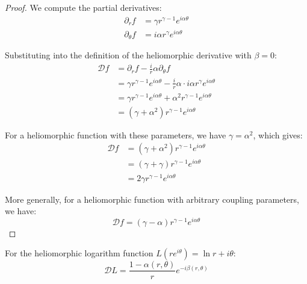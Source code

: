 \begin{proof}
We compute the partial derivatives:
\begin{align}
\partial_rf &= \gamma r^{\gamma-1}e^{i\alpha\theta}\\
\partial_\theta f &= i\alpha r^{\gamma}e^{i\alpha\theta}
\end{align}

Substituting into the definition of the heliomorphic derivative with $\beta = 0$:
\begin{align}
\mathcal{D}f &= \partial_rf - \frac{i}{r}\alpha\partial_\theta f\\
&= \gamma r^{\gamma-1}e^{i\alpha\theta} - \frac{i}{r}\alpha \cdot i\alpha r^{\gamma}e^{i\alpha\theta}\\
&= \gamma r^{\gamma-1}e^{i\alpha\theta} + \alpha^2 r^{\gamma-1}e^{i\alpha\theta}\\
&= \left(\gamma + \alpha^2\right)r^{\gamma-1}e^{i\alpha\theta}
\end{align}

For a heliomorphic function with these parameters, we have $\gamma = \alpha^2$, which gives:
\begin{align}
\mathcal{D}f &= \left(\gamma + \alpha^2\right)r^{\gamma-1}e^{i\alpha\theta}\\
&= \left(\gamma + \gamma\right)r^{\gamma-1}e^{i\alpha\theta}\\
&= 2\gamma r^{\gamma-1}e^{i\alpha\theta}
\end{align}

More generally, for a heliomorphic function with arbitrary coupling parameters, we have:
\begin{equation}
\mathcal{D}f = \left(\gamma - \alpha\right)r^{\gamma-1}e^{i\alpha\theta}
\end{equation}
\end{proof}

\begin{theorem}
For the heliomorphic logarithm function $L(re^{i\theta}) = \ln r + i\theta$:
\begin{equation}
\mathcal{D}L = \frac{1 - \alpha(r,\theta)}{r}e^{-i\beta(r,\theta)}
\end{equation}
\end{theorem}

